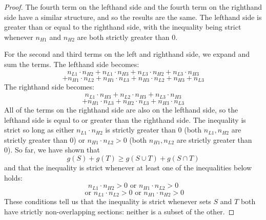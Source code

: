 \documentclass[sigconf]{acmart}
\newcommand{\nLv}[1]{\ensuremath{n_{L#1}}}
\newcommand{\nHv}[1]{\ensuremath{n_{H#1}}}
\newcommand{\cost}[0]{\ensuremath{g}}
\newcommand{\cd}[0]{\cdot}
\begin{document}
\begin{proof}
The fourth term on the lefthand side and the fourth term on the righthand side have a similar structure, and so the results are the same. The lefthand side is greater than or equal to the righthand side, with the inequality being strict whenever $\nHv{1}$ and $\nHv{2}$ are both strictly greater than 0. 

For the second and third terms on the left and righthand side, we expand and sum the terms. The lefthand side becomes: 
$$\nLv{1} \cd \nHv{2} + \nLv{1} \cd \nHv{3} + \nLv{3} \cd \nHv{2} + \nLv{3} \cd \nHv{3}$$
$$+ \nHv{1} \cd \nLv{2} + \nHv{1} \cd \nLv{3} + \nHv{3} \cd \nLv{2} + \nHv{3} + \nLv{3}$$
The righthand side becomes: 
$$\nLv{1} \cd \nHv{3} + \nLv{2} \cd \nHv{3} + \nLv{3} \cd \nHv{3}$$
$$+ \nHv{1} \cd \nLv{3} + \nHv{2} \cd \nLv{3} + \nHv{3} \cd \nLv{3}$$
All of the terms on the righthand side are also on the lefthand side, so the lefthand side is equal to or greater than the righthand side. The inequality is strict so long as either $\nLv{1} \cd \nHv{2}$ is strictly greater than 0 (both $\nLv{1}, \nHv{2}$ are strictly greater than 0) or $\nHv{1} \cd \nLv{2}>0$ (both $\nHv{1}, \nLv{2}$ are strictly greater than 0). 
So far, we have shown that 
$$\cost(S) + \cost(T) \geq \cost(S \cup T) + \cost(S \cap T)$$
and that the inequality is strict whenever at least one of the inequalities below holds: 
$$\nLv{1} \cd \nHv{2} > 0 \text{ or } \nHv{1} \cd \nLv{2} > 0$$
$$\text{ or } \nLv{1} \cd \nLv{2} > 0 \text{ or } \nHv{1} \cd \nHv{2} > 0$$
These conditions tell us that the inequality is strict whenever sets $S$ and $T$ both have strictly non-overlapping sections: neither is a subset of the other. 
\end{proof}

\evenstab*
\end{document}
